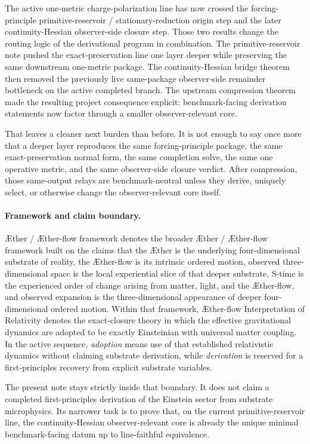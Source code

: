 \documentclass[11pt]{article}
\newcommand{\Aether}{\AE{}ther}
\newcommand{\Aflow}{\AE{}ther-flow}
\newcommand{\TheoryName}{\Aflow{} Interpretation of Relativity}
\newcommand{\TheoryProgram}{\Aether{} / \Aflow{} framework}
\begin{document}
The active one-metric charge-polarization line has now crossed the forcing-principle primitive-reservoir / stationary-reduction origin step and the later continuity-Hessian observer-side closure step. Those two results change the routing logic of the derivational program in combination. The primitive-reservoir note pushed the exact-preservation line one layer deeper while preserving the same downstream one-metric package. The continuity-Hessian bridge theorem then removed the previously live same-package observer-side remainder bottleneck on the active completed branch. The upstream compression theorem made the resulting project consequence explicit: benchmark-facing derivation statements now factor through a smaller observer-relevant core.

That leaves a cleaner next burden than before. It is not enough to say once more that a deeper layer reproduces the same forcing-principle package, the same exact-preservation normal form, the same completion solve, the same one operative metric, and the same observer-side closure verdict. After compression, those same-output relays are benchmark-neutral unless they derive, uniquely select, or otherwise change the observer-relevant core itself.

\paragraph{Framework and claim boundary.}
\TheoryProgram{} denotes the broader \Aether{} / \Aflow{} framework built on the claims that the \Aether{} is the underlying four-dimensional substrate of reality, the \Aflow{} is its intrinsic ordered motion, observed three-dimensional space is the local experiential slice of that deeper substrate, S-time is the experienced order of change arising from matter, light, and the \Aflow{}, and observed expansion is the three-dimensional appearance of deeper four-dimensional ordered motion. Within that framework, \TheoryName{} denotes the exact-closure theory in which the effective gravitational dynamics are adopted to be exactly Einsteinian with universal matter coupling. In the active sequence, \emph{adoption} means use of that established relativistic dynamics without claiming substrate derivation, while \emph{derivation} is reserved for a first-principles recovery from explicit substrate variables.

The present note stays strictly inside that boundary. It does not claim a completed first-principles derivation of the Einstein sector from substrate microphysics. Its narrower task is to prove that, on the current primitive-reservoir line, the continuity-Hessian observer-relevant core is already the unique minimal benchmark-facing datum up to line-faithful equivalence.
\end{document}
